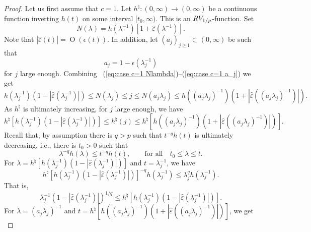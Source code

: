 \documentclass[10pt,a4paper]{amsart}
\newcommand{\RV}{\textup{RV}}
\newcommand{\op}{\operatorname}
\begin{document}
\begin{proof}
Let us first assume that $c=1$. Let $h^\natural:(0,\infty)\to(0,\infty)$ be a continuous function inverting $h(t)$ on some interval $[t_0,\infty)$. This is an $\RV_{1/p}$-function.
Set \begin{equation}\label{eq:case c=1 Nlambda}
N(\lambda)=h(\lambda^{-1})[1+\hat{\varepsilon}(\lambda^{-1})].
\end{equation} Note that  $|\hat{\varepsilon}(t)|=\op{O}(\epsilon(t))$. In addition, let $(a_j)_{j\geq1}\subset(0,\infty)$ be such that
\begin{equation}\label{eq:case c=1 a_j}
a_j=1-\epsilon(\lambda_j^{-1})
\end{equation} for $j$ large enough. Combining ~(\ref{eq:case c=1 Nlambda})--(\ref{eq:case c=1 a_j}) we get
\begin{equation*}
h(\lambda_j^{-1})(1-|\hat{\varepsilon}(\lambda_j^{-1})|)\leq N(\lambda_j)\leq j \leq N(a_j\lambda_j)\leq h((a_j\lambda_j)^{-1})(1+|\hat{\varepsilon}((a_j\lambda_j)^{-1})|).
\end{equation*}
As $h^\natural$ is ultimately increasing, for $j$ large enough, we have
\begin{equation*}
h^\natural[	h(\lambda_j^{-1})(1-|\hat{\varepsilon}(\lambda_j^{-1})|)]\leq h^\natural(j)\leq h^\natural[  h((a_j\lambda_j)^{-1})(1+|\hat{\varepsilon}((a_j\lambda_j)^{-1})|)].
\end{equation*}
Recall that, by assumption there is $q>p$ such that $t^{-q}h(t)$ is ultimately decreasing, i.e., there is $t_0>0$ such that
\begin{equation*}
\lambda^{-q}h(\lambda)\leq t^{-q}h(t),\qquad\mbox{for all}\quad t_0\leq \lambda\leq t.
\end{equation*}
For $\lambda=h^\natural[	h(\lambda_j^{-1})(1-|\hat{\varepsilon}(\lambda_j^{-1})|)]$ and $t=\lambda_j^{-1}$, we have
\begin{equation*}
h^\natural[	h(\lambda_j^{-1})(1-|\hat{\varepsilon}(\lambda_j^{-1})|)]^{-q}h(\lambda_j^{-1})\leq \lambda_j^qh(\lambda_j^{-1}).
\end{equation*}
That is,
\begin{equation}\label{eq:case c=1 lower}
\lambda_j^{-1}(1-|\hat{\varepsilon}(\lambda_j^{-1})|)^{1/q}\leq h^\natural[	h(\lambda_j^{-1})(1-|\hat{\varepsilon}(\lambda_j^{-1})|)].
\end{equation}
For $\lambda=(a_j\lambda_j)^{-1}$ and $t=h^\natural[  h((a_j\lambda_j)^{-1})(1+|\hat{\varepsilon}((a_j\lambda_j)^{-1})|)]$, we get
\begin{equation*}

\end{equation*}
\end{proof}
\end{document}
